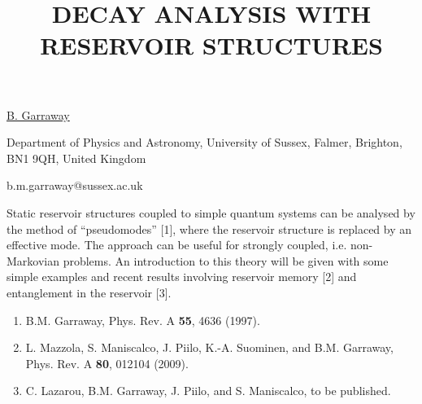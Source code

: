\title{DECAY ANALYSIS WITH RESERVOIR STRUCTURES}

\underline{B. Garraway} 

{\normalsize{\vspace{-4mm}
Department of Physics and Astronomy, University of Sussex, Falmer,
Brighton, BN1 9QH, United Kingdom

\email b.m.garraway@sussex.ac.uk}}

Static reservoir structures coupled to simple
 quantum systems can be analysed by the method of
``pseudomodes'' [1], where the reservoir structure is
 replaced by an effective mode. The approach can
 be useful for strongly coupled, i.e. non-Markovian
 problems. An introduction to this theory will be
 given with some simple examples and recent results
 involving reservoir memory [2] and entanglement
 in the reservoir [3].

\begin{enumerate}
\item B.M. Garraway, Phys. Rev. A \textbf{55}, 4636 (1997).
\item L. Mazzola, S. Maniscalco, J. Piilo, K.-A. Suominen, and B.M. Garraway, Phys. Rev. A \textbf{80}, 012104 (2009).
\item C. Lazarou, B.M. Garraway, J. Piilo, and S. Maniscalco, to be published.
\end{enumerate}

\vspace{\baselineskip} 
